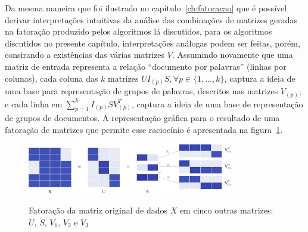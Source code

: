 \documentclass[
    12pt,                %
    oneside,            %
    a4paper,            %
    english,            %
    brazil                %
    ]{abntex2ppgsi}
\begin{document}
Da mesma maneira que foi ilustrado no capítulo~\ref{ch:fatoracao} que é possível derivar interpretações intuitivas da análise das combinações de matrizes geradas na fatoração produzido pelos algoritmos lá discutidos, para os algoritmos discutidos no presente capítulo, interpretações análogas podem ser feitas, porém, consirando a existências das várias matrizes $V$.
Assumindo novamente que uma matriz de entrada representa a relação ``documento por palavras'' (linhas por colunas), cada coluna das $k$ matrizes $U I_{(p)} S, \forall p \in \{1, \dots, k\}$, captura a ideia de uma base para representação de grupos de palavras, descritos nas matrizes $V_{(p)}$; e cada linha em $\sum_{p=1}^k I_{(p)} S V_{(p)}^T$, captura a ideia de uma base de representação de grupos de documentos.
A representação gráfica para o resultado de uma fatoração de matrizes que permite esse raciocínio é apresentada na figura~\ref{fig:factorizationXUSV1tok}.

\begin{figure}[H]
\centering
\caption{
Fatoração da matriz original de dados $X$ em cinco outras matrizes: $U$, $S$, $V_1$, $V_2$ e $V_3$}
\includegraphics[width=0.8\textwidth]{img/factorizationXUSV1tok.png}
\label{fig:factorizationXUSV1tok}
\end{figure}
\end{document}
